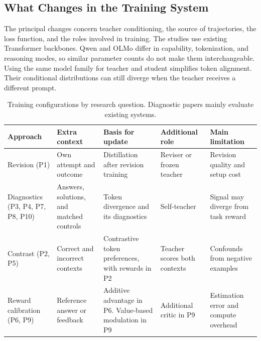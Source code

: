 \documentclass[11pt,a4paper]{article}
\begin{document}
\subsection{What Changes in the Training System}
The principal changes concern teacher conditioning, the source of trajectories, the loss function, and the roles involved in training. The studies use existing Transformer backbones. Qwen and OLMo differ in capability, tokenization, and reasoning modes, so similar parameter counts do not make them interchangeable. Using the same model family for teacher and student simplifies token alignment. Their conditional distributions can still diverge when the teacher receives a different prompt.

\begin{table}[htbp]
\centering\small
\caption{Training configurations by research question. Diagnostic papers mainly evaluate existing systems.}
\label{tab:systems}
\begin{tabularx}{\linewidth}{@{}YYYYY@{}}
\toprule
Approach & Extra context & Basis for update & Additional role & Main limitation\\
\midrule
Revision (P1) & Own attempt and outcome & Distillation after revision training & Reviser or frozen teacher & Revision quality and setup cost\\
Diagnostics (P3, P4, P7, P8, P10) & Answers, solutions, and matched controls & Token divergence and its diagnostics & Self-teacher & Signal may diverge from task reward\\
Contrast (P2, P5) & Correct and incorrect contexts & Contrastive token preferences, with rewards in P2 & Teacher scores both contexts & Confounds from negative examples\\
Reward calibration (P6, P9) & Reference answer or feedback & Additive advantage in P6. Value-based modulation in P9 & Additional critic in P9 & Estimation error and compute overhead\\
\bottomrule
\end{tabularx}
\end{table}
\end{document}
